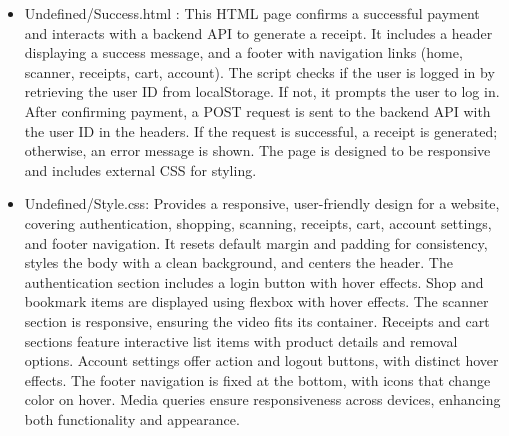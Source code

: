\documentclass[conference]{IEEEtran}
\begin{document}
\begin{itemize}
  \item Undefined/Success.html : This HTML page confirms a successful payment and interacts with a backend API to generate a receipt. It includes a header displaying a success message, and a footer with navigation links (home, scanner, receipts, cart, account). The script checks if the user is logged in by retrieving the user ID from localStorage. If not, it prompts the user to log in. After confirming payment, a POST request is sent to the backend API with the user ID in the headers. If the request is successful, a receipt is generated; otherwise, an error message is shown. The page is designed to be responsive and includes external CSS for styling.
  \item Undefined/Style.css: Provides a responsive, user-friendly design for a website, covering authentication, shopping, scanning, receipts, cart, account settings, and footer navigation. It resets default margin and padding for consistency, styles the body with a clean background, and centers the header. The authentication section includes a login button with hover effects. Shop and bookmark items are displayed using flexbox with hover effects. The scanner section is responsive, ensuring the video fits its container. Receipts and cart sections feature interactive list items with product details and removal options. Account settings offer action and logout buttons, with distinct hover effects. The footer navigation is fixed at the bottom, with icons that change color on hover. Media queries ensure responsiveness across devices, enhancing both functionality and appearance.
  

\end{itemize}
\end{document}
